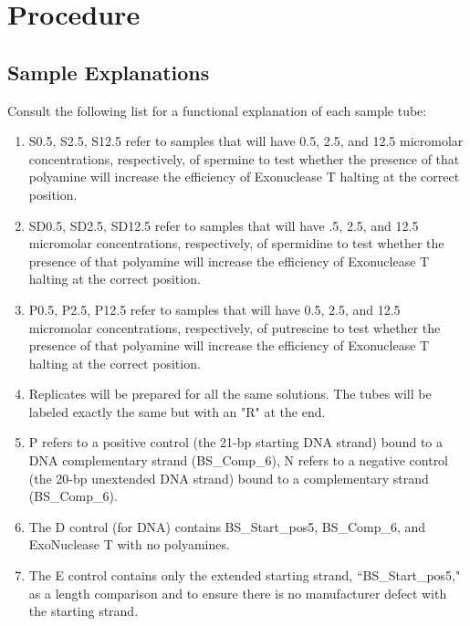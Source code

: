 \documentclass{ssiBio}
\begin{document}
\begin{enumerate}

\end{enumerate}

\section{Procedure}%
\subsection{Sample Explanations}
Consult the following list for a functional explanation of each sample tube:
\begin{enumerate}

\item{S0.5, S2.5, S12.5 refer to samples that will have 0.5, 2.5, and 12.5 micromolar concentrations, respectively, of spermine to test whether the presence of that polyamine will increase the efficiency of Exonuclease T halting at the correct position.}

\item{SD0.5, SD2.5, SD12.5 refer to samples that will have .5, 2.5, and 12.5 micromolar concentrations, respectively, of spermidine to test whether the presence of that polyamine will increase the efficiency of Exonuclease T halting at the correct position.}

\item{P0.5, P2.5, P12.5 refer to samples that will have 0.5, 2.5, and 12.5 micromolar concentrations, respectively, of putrescine to test whether the presence of that polyamine will increase the efficiency of Exonuclease T halting at the correct position.}

\item{Replicates will be prepared for all the same solutions. The tubes will be labeled exactly the same but with an "R" at the end.}

\item{P refers to a positive control (the 21-bp starting DNA strand) bound to a DNA complementary strand (BS\_Comp\_6), N refers to a negative control (the 20-bp unextended DNA strand) bound to a complementary strand (BS\_Comp\_6). }
\item{The D control (for DNA) contains BS\_Start\_pos5, BS\_Comp\_6, and ExoNuclease T with no polyamines.}
\item{The E control contains only the extended starting strand, ``BS\_Start\_pos5," as a length comparison and to ensure there is no manufacturer defect with the starting strand.} %


\end{enumerate}
\end{document}
